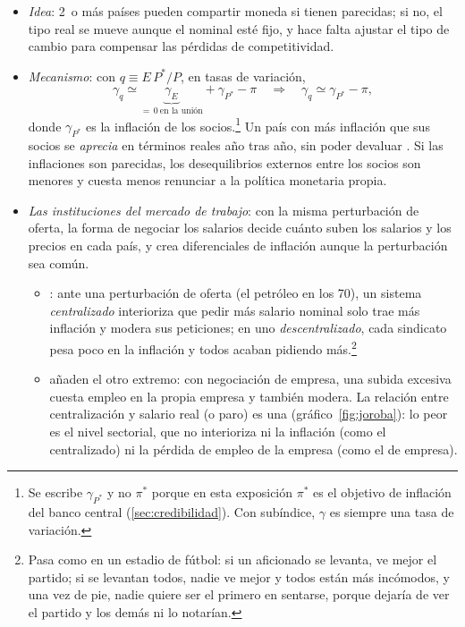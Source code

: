 \documentclass[11pt]{article}
\begin{document}
\begin{itemize}
\item \emph{Idea}: 2~o más países pueden compartir moneda si tienen  parecidas; si no, el tipo real se mueve aunque el nominal esté fijo, y hace falta ajustar el tipo de cambio para compensar las pérdidas de competitividad\nocite{Magnifico1971European}.
\item \emph{Mecanismo}: con $q\equiv E\,P^*/P$, en tasas de variación,
  \begin{equation}
  \gamma_q\simeq\underbrace{\gamma_E}_{=\,0\ \text{en la unión}}+\gamma_{P^*}-\pi
  \quad\Longrightarrow\quad \gamma_q\simeq\gamma_{P^*}-\pi,
  \label{eq:magnifico}
  \end{equation}
  donde $\gamma_{P^*}$ es la inflación de los socios.\footnote{Se escribe $\gamma_{P^*}$ y no $\pi^*$ porque en esta exposición $\pi^*$ es el objetivo de inflación del banco central (\ref{sec:credibilidad}). Con subíndice, $\gamma$ es siempre una tasa de variación.} Un país con más inflación que sus socios se \emph{aprecia} en términos reales año tras año, sin poder devaluar . Si las inflaciones son parecidas, los desequilibrios externos entre los socios son menores y cuesta menos renunciar a la política monetaria propia.
\item \emph{Las instituciones del mercado de trabajo}: con la misma perturbación de oferta, la forma de negociar los salarios decide cuánto suben los salarios y los precios en cada país, y crea diferenciales de inflación aunque la perturbación sea común\nocite{BrunoSachs1985Economics}.
  \begin{itemize}
  \item \textcite{BrunoSachs1985Economics}: ante una perturbación de oferta (el petróleo en los 70), un sistema \emph{centralizado} interioriza que pedir más salario nominal solo trae más inflación y modera sus peticiones; en uno \emph{descentralizado}, cada sindicato pesa poco en la inflación y todos acaban pidiendo más.\footnote{Pasa como en un estadio de fútbol: si un aficionado se levanta, ve mejor el partido; si se levantan todos, nadie ve mejor y todos están más incómodos, y una vez de pie, nadie quiere ser el primero en sentarse, porque dejaría de ver el partido y los demás ni lo notarían.}
  \item \textcite{CalmforsDriffill1988} añaden el otro extremo: con negociación de empresa, una subida excesiva cuesta empleo en la propia empresa y también modera. La relación entre centralización y salario real (o paro) es una  (gráfico~\ref{fig:joroba}): lo peor es el nivel sectorial, que no interioriza ni la inflación (como el centralizado) ni la pérdida de empleo de la empresa (como el de empresa).

\end{itemize}
\end{itemize}
\end{document}
